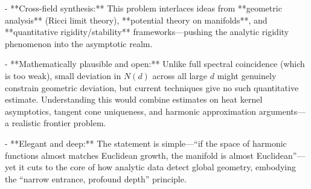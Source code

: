 - **Cross-field synthesis:**  
  This problem interlaces ideas from **geometric analysis** (Ricci limit theory), **potential theory on manifolds**, and **quantitative rigidity/stability** frameworks—pushing the analytic rigidity phenomenon into the asymptotic realm.

- **Mathematically plausible and open:**  
  Unlike full spectral coincidence (which is too weak), small deviation in \(N(d)\) across all large \(d\) might genuinely constrain geometric deviation, but current techniques give no such quantitative estimate. Understanding this would combine estimates on heat kernel asymptotics, tangent cone uniqueness, and harmonic approximation arguments—a realistic frontier problem.

- **Elegant and deep:**  
  The statement is simple—“if the space of harmonic functions almost matches Euclidean growth, the manifold is almost Euclidean”—yet it cuts to the core of how analytic data detect global geometry, embodying the “narrow entrance, profound depth” principle.